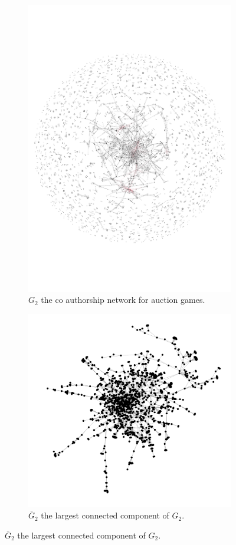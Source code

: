 \documentclass{article}
\theoremstyle{definition}
\begin{document}
\begin{figure}[!hbtp]
     \begin{subfigure}{.45\textwidth}\centering
        \includegraphics[width=.54\textwidth]{./assets/images/auction.pdf}
        \caption{\(G_2\) the co authorship network for auction games.}\label{fig:g_two}
     \end{subfigure}\hfill
    \begin{subfigure}{.45\textwidth}\centering
        \includegraphics[width=.8\textwidth]{./assets/images/auction_network_cluster.pdf}
        \caption{\(\bar{G}_{2}\) the largest connected component of \(G_2\).}\label{fig:g_two_cluster}
    \end{subfigure}


\end{figure}
\end{document}
